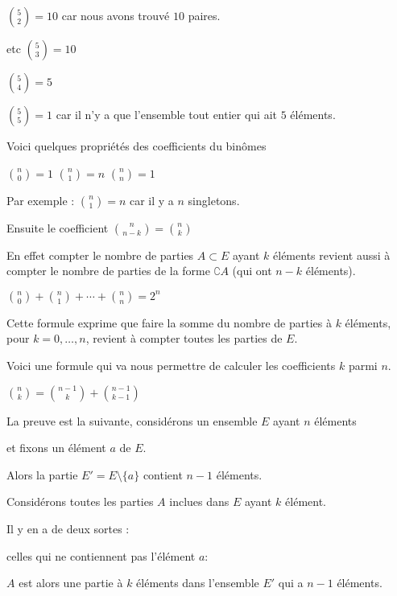 $\binom{5}{2} = 10$ car nous avons trouvé $10$ paires.

etc $\binom{5}{3} = 10$

$\binom{5}{4} = 5$

$\binom{5}{5} = 1$ car il n'y a que l'ensemble tout entier qui ait $5$ éléments.


\change

Voici quelques propriétés des coefficients du binômes


 $\binom{n}{0}=1$ \quad  $\binom{n}{1}=n$ \quad  $\binom{n}{n}=1$

Par exemple : $\binom{n}{1}=n$ car il y a $n$ singletons.

\change

Ensuite le coefficient $\binom{n}{n-k} = \binom{n}{k}$

En effet compter le nombre de parties $A \subset E$ ayant $k$ éléments revient aussi à compter
le nombre de parties de la forme $\complement A$ (qui ont $n-k$ éléments).


\change

$\binom{n}{0}+\binom{n}{1}+\cdots+\binom{n}{n} = 2^n$

Cette formule exprime que 
faire la somme du nombre de parties à $k$ éléments, pour $k=0,\ldots,n$, 
revient à compter toutes les parties de $E$.



\diapo

Voici une formule qui va nous permettre de calculer les coefficients $k$ parmi $n$.

$\binom n k = \binom{n-1}{k} + \binom{n-1}{k-1}$

\change

La preuve est la suivante, considérons un ensemble $E$ ayant $n$ éléments

et fixons un élément $a$ de $E$.

Alors la partie $E'= E \setminus \{a\}$ contient $n-1$ éléments.

\change


Considérons toutes les parties $A$ inclues dans $E$ ayant $k$ élément.

Il y en a de deux sortes :

\change

celles qui ne contiennent pas l'élément $a$: 

\change 

$A$ est alors une partie à $k$ éléments dans l'ensemble $E'$ qui a $n-1$ éléments. 

